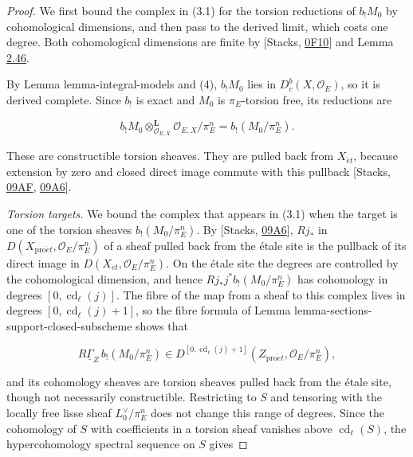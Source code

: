 \documentclass[11pt]{article}
\providecommand{\Dbc}{}\renewcommand{\Dbc}{D^b_c}
\begin{document}
\begin{proof}[{Proof}]\label{bp425}%
We first bound the complex in (3.1) for the torsion reductions of \(b_!M_0\) by cohomological dimensions, and then pass to the derived limit, which costs one degree. Both cohomological dimensions are finite by [Stacks, \href{https://stacks.math.columbia.edu/tag/0F10}{0F10}] and Lemma \hyperref[bp139]{2.46}.

By Lemma lemma-integral-models and (4), \(b_!M_0\) lies in \(\Dbc(X,\mathcal O_E)\), so it is derived complete. Since \(b_!\) is exact and \(M_0\) is \(\pi_E\)-torsion free, its reductions are

\[
b_!M_0\otimes^{\mathbf L}_{\mathcal O_{E,X}}\mathcal O_{E,X}/\pi_E^n
=b_!(M_0/\pi_E^n).
\]

These are constructible torsion sheaves. They are pulled back from \(X_{\acute{e}t}\), because extension by zero and closed direct image commute with this pullback [Stacks, \href{https://stacks.math.columbia.edu/tag/09AF}{09AF}, \href{https://stacks.math.columbia.edu/tag/09A6}{09A6}].

\emph{Torsion targets.} We bound the complex that appears in (3.1) when the target is one of the torsion sheaves \(b_!(M_0/\pi_E^n)\). By [Stacks, \href{https://stacks.math.columbia.edu/tag/09A6}{09A6}], \(Rj_*\) in \(D(X_{\mathrm{pro}\acute{e}t},\mathcal O_E/\pi_E^n)\) of a sheaf pulled back from the étale site is the pullback of its direct image in \(D(X_{\acute{e}t},\mathcal O_E/\pi_E^n)\). On the étale site the degrees are controlled by the cohomological dimension, and hence \(Rj_*j^*b_!(M_0/\pi_E^n)\) has cohomology in degrees \([0,\operatorname{cd}_\ell(j)]\). The fibre of the map from a sheaf to this complex lives in degrees \([0,\operatorname{cd}_\ell(j)+1]\), so the fibre formula of Lemma lemma-sections-support-closed-subscheme shows that

\[
R\underline\Gamma_Z\,b_!(M_0/\pi_E^n)\in D^{[0,\operatorname{cd}_\ell(j)+1]}(Z_{\mathrm{pro}\acute{e}t},\mathcal O_E/\pi_E^n),
\]

and its cohomology sheaves are torsion sheaves pulled back from the étale site, though not necessarily constructible. Restricting to \(S\) and tensoring with the locally free lisse sheaf \(L_0^\vee/\pi_E^n\) does not change this range of degrees. Since the cohomology of \(S\) with coefficients in a torsion sheaf vanishes above \(\operatorname{cd}_\ell(S)\), the hypercohomology spectral sequence on \(S\) gives


\end{proof}
\end{document}
